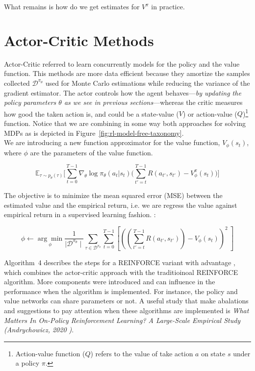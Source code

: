 \noindent What remains is how do we get estimates for $V^{\pi}$ in practice.

\section{Actor-Critic Methods}

Actor-Critic referred to learn concurrently models for the policy and the value function. This methods are more data efficient because they amortize the samples collected $\mathcal{D}^{\pi_{\theta}}$ used for Monte Carlo estimations while reducing the variance of the gradient estimator. The actor controls how the agent behaves---\textit{by updating the policy parameters $\theta$ as we see in previous sections}---whereas the critic measures how good the taken action is, and could be a state-value ($V$) or action-value ($Q$)\footnote{Action-value function ($Q$) refers to the value of take action $a$ on state $s$ under a policy $\pi$.} function. Notice that we are combining in some way both approaches for solving MDPs as is depicted in Figure~\ref{fig:rl-model-free-taxonomy}.\\

\noindent We are introducing a new function approximator for the value function, $V_{\phi}(s_{t})$, where $\phi$ are the parameters of the value function. 

\begin{equation}\label{eqn:actor-critic-objective}
    \mathbb{E}_{\tau\sim p_{\theta}(\tau)} \bigg[\sum_{t=0}^{T-1}\nabla_{\theta}\log\pi_{\theta}(a_{t}|s_{t}) \bigg( \sum_{t'=t}^{T-1} R(a_{t'}, s_{t'}) - V_{\phi}^{\pi}(s_{t}) \bigg) \bigg]
\end{equation}

\noindent The objective is to minimize the mean squared error (MSE) between the estimated value and the empirical return, i.e. we are regress the value against empirical return in a supervised learning fashion. :

\begin{equation}\label{eqn:value-function-loss}
   \phi \leftarrow \underset{\phi}{\arg\min} \frac{1}{\mid\mathcal{D}^{\pi_{\theta}}\mid}\sum_{\tau\in\mathcal{D}^{\pi_{\theta}}}\sum_{t=0}^{T-1}\left[\left(\left(\sum_{t'=t}^{T-1} R(a_{t'}, s_{t'})\right) - V_{\phi}(s_{t})\right)^2~\right]
\end{equation}

\noindent Algorithm~4 describes the steps for a REINFORCE variant with advantage , which combines the actor-critic approach with the traditioinoal REINFORCE algorithm. More components were introduced and can influence in the performance when the algorithm is implemented. For instance, the policy and value networks can share parameters or not. A useful study that make abalations and suggestions to pay attention when these algorithms are implemented is \textit{What Matters In On-Policy Reinforcement Learning? A Large-Scale Empirical Study (Andrychowicz, 2020 \cite{andrychowicz2020mattersonpolicyreinforcementlearning})}.\\

